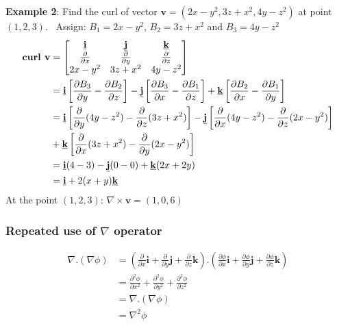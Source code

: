 \documentclass[10pt,a4paper]{article}
\begin{document}
\textbf{Example 2}: Find the curl of vector $\textbf{v}=(2x-y^2,3z+x^2,4y-z^2)$ at point $(1,2,3)$.
\
Assign: $B_1 = 2x-y^2$, $B_2=3z+x^2$ and $B_3=4y-z^2$
\begin{equation*}
    \begin{aligned}
        \textbf{curl }\textbf{v} &= 
        \begin{bmatrix}
            \textbf{\underline{i}} & \textbf{\underline{j}} & \textbf{\underline{k}} \\
            \frac{\partial}{\partial x} & \frac{\partial}{\partial y} & \frac{\partial}{\partial z} \\
            2x-y^2 & 3z+x^2 & 4y-z^2
        \end{bmatrix} \\
        &= \textbf{\underline{i}}\left[\frac{\partial B_3}{\partial y}-\frac{\partial B_2}{\partial z}\right] - \textbf{\underline{j}}\left[\frac{\partial B_3}{\partial x}-\frac{\partial B_1}{\partial z}\right] + \textbf{\underline{k}}\left[\frac{\partial B_2}{\partial x}-\frac{\partial B_1}{\partial y}\right] \\
        &= \textbf{\underline{i}}\left[\frac{\partial}{\partial y}(4y-z^2)-\frac{\partial}{\partial z}(3z+x^2)\right] - \textbf{\underline{j}}\left[\frac{\partial}{\partial x}(4y-z^2)-\frac{\partial}{\partial z}(2x-y^2)\right]\\ &+ \textbf{\underline{k}}\left[\frac{\partial}{\partial x}(3z+x^2)-\frac{\partial}{\partial y}(2x-y^2)\right] \\
        &= \textbf{\underline{i}}(4-3) - \textbf{\underline{j}}(0-0)+\textbf{\underline{k}}(2x+2y) \\
        &= \textbf{\underline{i}} + 2(x+y)\textbf{\underline{k}}
    \end{aligned}
\end{equation*}
At the point $(1,2,3)$: $\nabla \times \textbf{v} = (1,0,6)$

\subsubsection{Repeated use of $\nabla$ operator}

\begin{align*}
    \nabla . (\nabla \phi) &= \left(\frac{\partial}{\partial x}\textbf{i}+\frac{\partial}{\partial y}\textbf{j}+\frac{\partial}{\partial z}\textbf{k}\right).\left(\frac{\partial \phi}{\partial x}\textbf{i}+\frac{\partial \phi}{\partial y}\textbf{j}+\frac{\partial \phi}{\partial z}\textbf{k}\right) \\
    &= \frac{\partial^2\phi}{\partial x^2} + \frac{\partial^2 \phi}{\partial y^2}+\frac{\partial^2\phi}{\partial z^2} \\
    &= \nabla.(\nabla \phi) \\
    &= \nabla^2\phi
\end{align*}
\end{document}
